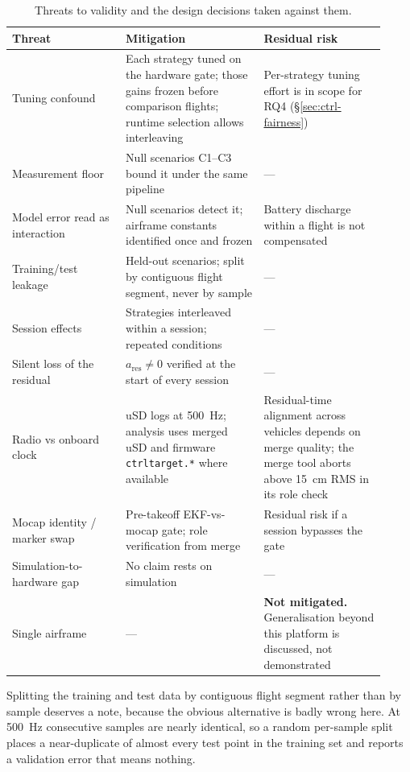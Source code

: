 \begin{table}[t]
  \centering
  \caption{Threats to validity and the design decisions taken against them.}
  \label{tab:setup-threats}
  \small
  \begin{tabular}{@{}p{0.28\linewidth}p{0.34\linewidth}p{0.30\linewidth}@{}}
    \toprule
    Threat & Mitigation & Residual risk \\
    \midrule
    Tuning confound & Each strategy tuned on the hardware gate; those gains frozen before comparison flights; runtime selection allows interleaving & Per-strategy tuning effort is in scope for RQ4 (§\ref{sec:ctrl-fairness}) \\
    Measurement floor & Null scenarios C1--C3 bound it under the same pipeline & --- \\
    Model error read as interaction & Null scenarios detect it; airframe constants identified once and frozen & Battery discharge within a flight is not compensated \\
    Training/test leakage & Held-out scenarios; split by contiguous flight segment, never by sample & --- \\
    Session effects & Strategies interleaved within a session; repeated conditions & --- \\
    Silent loss of the residual & $a_{\mathrm{res}} \neq 0$ verified at the start of every session & --- \\
    Radio vs onboard clock & uSD logs at \SI{500}{\hertz}; analysis uses merged uSD and firmware \texttt{ctrltarget.*} where available & Residual-time alignment across vehicles depends on merge quality; the merge tool aborts above \SI{15}{\centi\metre} RMS in its role check \\
    Mocap identity / marker swap & Pre-takeoff EKF-vs-mocap gate; role verification from merge & Residual risk if a session bypasses the gate \\
    Simulation-to-hardware gap & No claim rests on simulation & --- \\
    Single airframe & --- & \textbf{Not mitigated.} Generalisation beyond this platform is discussed, not demonstrated \\
    \bottomrule
  \end{tabular}
\end{table}

Splitting the training and test data by contiguous flight segment rather than by sample deserves a
note, because the obvious alternative is badly wrong here. At \SI{500}{\hertz} consecutive samples
are nearly identical, so a random per-sample split places a near-duplicate of almost every test
point in the training set and reports a validation error that means nothing.

